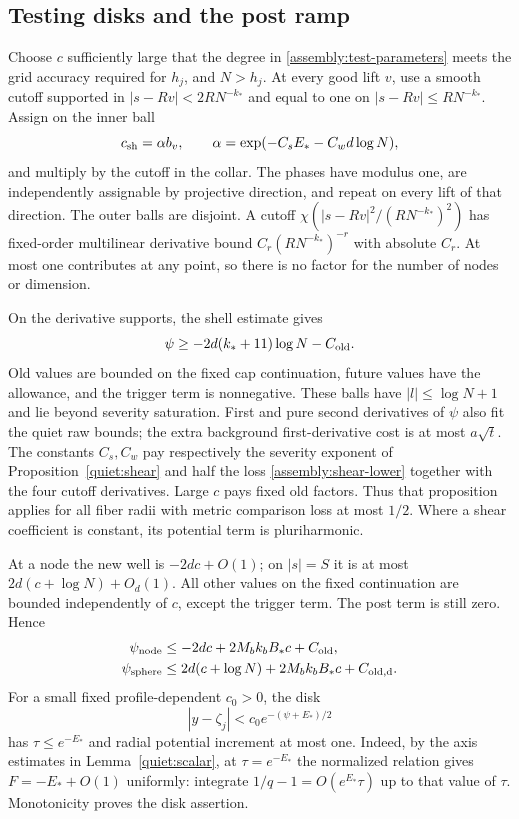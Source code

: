 \subsection{Testing disks and the post ramp}

Choose $c$ sufficiently large that the degree in
\eqref{assembly:test-parameters} meets the grid accuracy required for
$h_j$, and $N>h_j$. At every good lift $v$, use a smooth cutoff
supported in $|s-Rv|<2RN^{-k_*}$ and equal to one on
$|s-Rv|\leq RN^{-k_*}$. Assign on the inner ball
\begin{equation}\label{assembly:shear-amplitude}
 c_{\rm sh}=\alpha b_v,\qquad
 \alpha=\exp(-C_sE_*-C_wd\log N),
\end{equation}
and multiply by the cutoff in the collar. The phases have modulus
one, are independently assignable by projective direction, and
repeat on every lift of that direction. The outer balls are disjoint.
A cutoff $\chi(|s-Rv|^2/(RN^{-k_*})^2)$ has fixed-order multilinear
derivative bound $C_r(RN^{-k_*})^{-r}$ with absolute $C_r$.
At most one contributes at any point, so there is no factor for
the number of nodes or dimension.

On the derivative supports, the shell estimate gives
\begin{equation}\label{assembly:shear-lower}
 \psi\geq-2d(k_*+11)\log N-C_{\rm old}.
\end{equation}
Old values are bounded on the fixed cap continuation, future values
have the allowance, and the trigger term is nonnegative.
These balls have $|l|\leq\log N+1$ and lie beyond severity
saturation. First and pure second derivatives of $\psi$ also fit
the quiet raw bounds; the extra background first-derivative cost
is at most $a\sqrt t$. The constants $C_s,C_w$ pay respectively
the severity exponent of Proposition~\ref{quiet:shear} and half the
loss \eqref{assembly:shear-lower} together with the four cutoff
derivatives. Large $c$ pays fixed old factors. Thus that proposition
applies for all fiber radii with metric comparison loss at most
$1/2$. Where a shear coefficient is constant, its potential term
is pluriharmonic.

At a node the new well is $-2dc+O(1)$; on $|s|=S$ it is at most
$2d(c+\log N)+O_d(1)$. All other values on the fixed continuation
are bounded independently of $c$, except the trigger term.
The post term is still zero. Hence
\begin{align}
 \psi_{\rm node}&\leq-2dc+2M_bk_bB_*c+C_{\rm old},
 \label{assembly:node-twist}\\
 \psi_{\rm sphere}&\leq2d(c+\log N)+2M_bk_bB_*c+C_{\rm old,d}.
 \label{assembly:sphere-twist}
\end{align}
For a small fixed profile-dependent $c_0>0$, the disk
\begin{equation}\label{assembly:fiber-disk}
 |y-\zeta_j|<c_0e^{-(\psi+E_*)/2}
\end{equation}
has $\tau\leq e^{-E_*}$ and radial potential increment at most one.
Indeed, by the axis estimates in Lemma~\ref{quiet:scalar}, at
$\tau=e^{-E_*}$ the normalized relation gives $F=-E_*+O(1)$ uniformly: integrate $1/q-1=O(e^{E_*}\tau)$
up to that value of $\tau$. Monotonicity proves the disk assertion.

